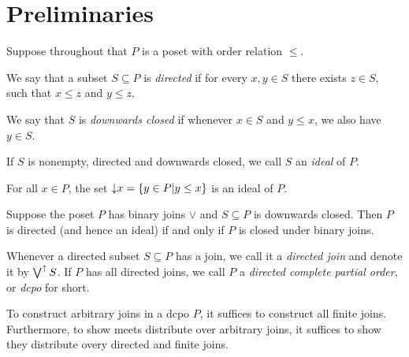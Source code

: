 \chapter{Preliminaries}
Suppose throughout that \(P\) is a poset with order relation \(\leq\).
\begin{definition}
  \label{def:directed}
  \leanok
  We say that a subset \(S \subseteq P\) is \emph{directed} if for every \(x, y \in S\) there exists \(z \in S\), such that \(x \leq z\) and \(y \leq z\).
\end{definition}

\begin{definition}
  \label{def:lower}
  \leanok
  We say that \(S\) is \emph{downwards closed} if whenever \(x \in S\) and \(y \leq x\), we also have \(y \in S\).
\end{definition}

\begin{definition}
  \leanok
  If \(S\) is nonempty, directed and downwards closed, we call \(S\) an \emph{ideal} of \(P\).
\end{definition}

\begin{lemma}
  \leanok
  For all \(x \in P\), the set \({\downarrow}x = \left\{y \in P \vert y \leq x\right\}\) is an ideal of \(P\).
\end{lemma}

\begin{lemma}
  Suppose the poset \(P\) has binary joins \(\vee\) and \(S \subseteq P\) is downwards closed.
  Then \(P\) is directed (and hence an ideal) if and only if \(P\) is closed under binary joins. 
\end{lemma}

\begin{definition}
  \leanok
  Whenever a directed subset \(S \subseteq P\) has a join, we call it a \emph{directed join} and denote it by \(\bigvee^{\uparrow} S\). If \(P\) has all directed joins, we call \(P\) a \emph{directed complete partial order}, or \emph{dcpo} for short.
\end{definition}

\begin{lemma}
  To construct arbitrary joins in a dcpo \(P\), it suffices to construct all finite joins. Furthermore, to show meets distribute over arbitrary joins, it suffices to show they distribute overy directed and finite joins.
\end{lemma}

